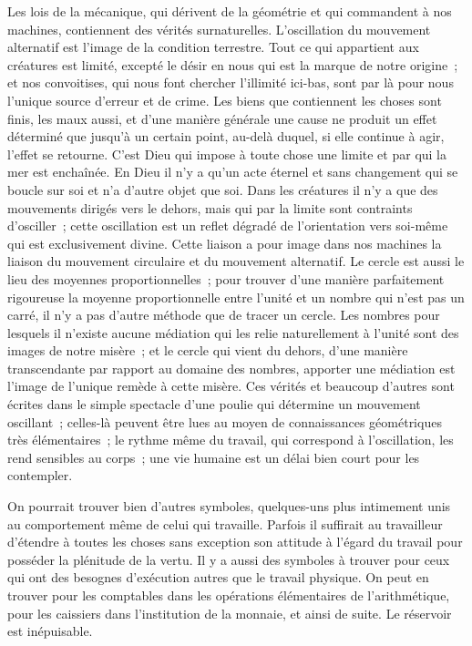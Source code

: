 \documentclass[french,twoside]{book} %
\begin{document}
Les lois de la mécanique, qui dérivent de la géométrie et qui commandent à nos machines, contiennent des vérités surnaturelles. L'oscillation du mouvement alternatif est l'image de la condition terrestre. Tout ce qui appartient aux créatures est limité, excepté le désir en nous qui est la marque de notre origine ; et nos convoitises, qui nous font chercher l'illimité ici-bas, sont par là pour nous l'unique source d'erreur et de crime. Les biens que contiennent les choses sont finis, les maux aussi, et d'une manière générale une cause ne produit un effet déterminé que jusqu'à un certain point, au-delà duquel, si elle continue à agir, l'effet se retourne. C'est Dieu qui impose à toute chose une limite et par qui la mer est enchaînée. En Dieu il n'y a qu'un acte éternel et sans changement qui se boucle sur soi et n'a d'autre objet que soi. Dans les créatures il n'y a que des mouvements dirigés vers le dehors, mais qui par la limite sont contraints d'osciller ; cette oscillation est un reflet dégradé de l'orientation vers soi-même qui est exclusivement divine. Cette liaison a pour image dans nos machines la liaison du mouvement circulaire et du mouvement alternatif. Le cercle est aussi le lieu des moyennes proportionnelles ; pour trouver d'une manière parfaitement rigoureuse la moyenne proportionnelle entre l'unité et un nombre qui n'est pas un carré, il n'y a pas d'autre méthode que de tracer un cercle. Les nombres pour lesquels il n'existe aucune médiation qui les relie naturellement à l'unité sont des images de notre misère ; et le cercle qui vient du dehors, d'une manière transcendante par rapport au domaine des nombres, apporter une médiation est l'image de l'unique remède à cette misère. Ces vérités et beaucoup d'autres sont écrites dans le simple spectacle d'une poulie qui détermine un mouvement oscillant ; celles-là peuvent être lues au moyen de connaissances géométriques très élémentaires ; le rythme même du travail, qui correspond à l'oscillation, les rend sensibles au corps ; une vie humaine est un délai bien court pour les contempler.\par
On pourrait trouver bien d'autres symboles, quelques-uns plus intimement unis au comportement même de celui qui travaille. Parfois il suffirait au travailleur d'étendre à toutes les choses sans exception son attitude à l'égard du travail pour posséder la plénitude de la vertu. Il y a aussi des symboles à trouver pour ceux qui ont des besognes d'exécution autres que le travail physique. On peut en trouver pour les comptables dans les opérations élémentaires de l'arithmétique, pour les caissiers dans l'institution de la monnaie, et ainsi de suite. Le réservoir est inépuisable.\par
\end{document}
